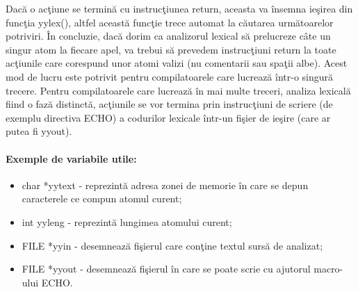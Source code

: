 Dac\u{a} o ac\c{t}iune se termin\u{a} cu instruc\c{t}iunea return, aceasta va \^{i}nsemna ie\c{s}irea din func\c{t}ia yylex(), altfel aceast\u{a} func\c{t}ie trece automat la c\u{a}utarea urm\u{a}toarelor potriviri. \^{I}n concluzie, dac\u{a} dorim ca analizorul lexical s\u{a} prelucreze c\^{a}te un singur atom la fiecare apel, va trebui s\u{a} prevedem instruc\c{t}iuni return la toate ac\c{t}iunile care corespund unor atomi valizi (nu comentarii sau spa\c{t}ii albe). Acest mod de lucru este potrivit pentru compilatoarele care lucreaz\u{a} \^{i}ntr-o singur\u{a} trecere. Pentru compilatoarele care lucreaz\u{a} \^{i}n mai multe treceri, analiza lexical\u{a} fiind o faz\u{a} distinct\u{a}, ac\c{t}iunile se vor termina prin instruc\c{t}iuni de scriere (de exemplu directiva ECHO) a codurilor lexicale \^{i}ntr-un fi\c{s}ier de ie\c{s}ire (care ar putea fi yyout). 

\paragraph{Exemple de variabile utile:}
\begin{itemize}
	\item char *yytext - reprezint\u{a} adresa zonei de memorie \^{i}n care se depun caracterele ce compun atomul curent;
	\item int yyleng - reprezint\u{a} lungimea atomului curent;
	\item FILE *yyin - desemneaz\u{a} fi\c{s}ierul care con\c{t}ine textul surs\u{a} de analizat;
	\item FILE *yyout - desemneaz\u{a} fi\c{s}ierul \^{i}n care se poate scrie cu ajutorul macro-ului ECHO.
\end{itemize}

